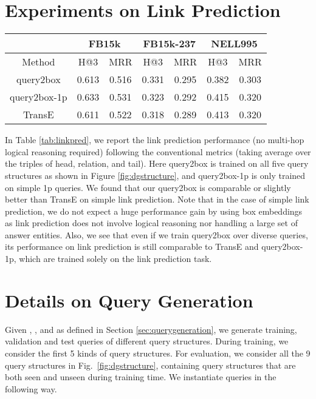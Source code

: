 \section{Experiments on Link Prediction} \label{app:linkpred}

\begin{table*}[!h]
\centering
\begin{tabular}{|c|c|c|c|c|c|c|}
\hline
             & \multicolumn{2}{c|}{FB15k} & \multicolumn{2}{c|}{FB15k-237} & \multicolumn{2}{c|}{NELL995} \\ \hline
Method       & H@3          & MRR         & H@3            & MRR           & H@3           & MRR          \\ \hline
query2box    & 0.613        & 0.516       & 0.331          & 0.295         & 0.382            & 0.303           \\ \hline
query2box-1p & 0.633        & 0.531       & 0.323          & 0.292         & 0.415            & 0.320           \\ \hline
TransE       & 0.611        & 0.522       & 0.318          & 0.289         & 0.413            & 0.320           \\ \hline
\end{tabular}
\caption{Performance comparison on the simple link prediction task on the three datasets.}
\label{tab:linkpred}
\end{table*}


In Table \ref{tab:linkpred}, we report the link prediction performance (no multi-hop logical reasoning required) following the conventional metrics (taking average over the triples of head, relation, and tail). Here query2box is trained on all five query structures as shown in Figure \ref{fig:dgstructure}, and query2box-1p is only trained on simple 1p queries. We found that our query2box is comparable or slightly better than TransE on simple link prediction. Note that in the case of simple link prediction, we do not expect a huge performance gain by using box embeddings as link prediction does not involve logical reasoning nor handling a large set of answer entities. Also, we see that even if we train query2box over diverse queries, its performance on link prediction is still comparable to TransE and query2box-1p, which are trained solely on the link prediction task.

\section{Details on Query Generation}
\label{app:pre-traversal}
Given , , and  as defined in Section \ref{sec:querygeneration}, we generate training, validation and test queries of different query structures. During training, we consider the first 5 kinds of query structures. For evaluation, we consider all the 9 query structures in Fig.~\ref{fig:dgstructure}, containing query structures that are both seen and unseen during training time. We instantiate queries in the following way.

